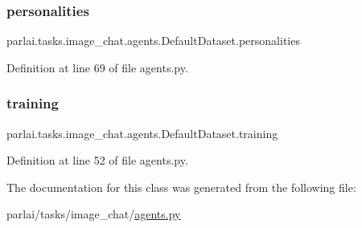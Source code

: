 \subsubsection{\texorpdfstring{personalities}{personalities}}
{\footnotesize\ttfamily parlai.\+tasks.\+image\+\_\+chat.\+agents.\+Default\+Dataset.\+personalities}



Definition at line 69 of file agents.\+py.

\mbox{\label{classparlai_1_1tasks_1_1image__chat_1_1agents_1_1DefaultDataset_a2419786bfafc52743cd7a551a5bad7d1}} 
\subsubsection{\texorpdfstring{training}{training}}
{\footnotesize\ttfamily parlai.\+tasks.\+image\+\_\+chat.\+agents.\+Default\+Dataset.\+training}



Definition at line 52 of file agents.\+py.



The documentation for this class was generated from the following file\+:\begin{DoxyCompactItemize}
\item 
parlai/tasks/image\+\_\+chat/\hyperlink{parlai_2tasks_2image__chat_2agents_8py}{agents.\+py}\end{DoxyCompactItemize}
